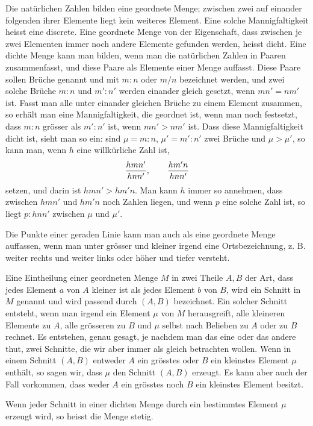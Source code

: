 \documentclass[11pt]{article}
\begin{document}
Die natürlichen Zahlen bilden eine geordnete Menge; zwischen zwei auf einander folgenden ihrer Elemente liegt kein weiteres Element. Eine solche Mannigfaltigkeit heisst eine discrete. Eine geordnete Menge von der Eigenschaft, dass zwischen je zwei Elementen immer noch andere Elemente gefunden werden, heisst dicht. Eine dichte Menge kann man bilden, wenn man die natürlichen Zahlen in Paaren zusammenfasst, und diese Paare als Elemente einer Menge auffasst. Diese Paare sollen Brüche genannt und mit $m:n$ oder $m/n$ bezeichnet werden, und zwei solche Brüche $m:n$ und $m':n'$ werden einander gleich gesetzt, wenn $mn'=nm'$ ist. Fasst man alle unter einander gleichen Brüche zu einem Element zusammen, so erhält man eine Mannigfaltigkeit, die geordnet ist, wenn man noch festsetzt, dass $m:n$ grösser als $m':n'$ ist, wenn $mn'>nm'$ ist. Dass diese Mannigfaltigkeit dicht ist, sieht man so ein: sind $\mu=m:n$, $\mu'=m':n'$ zwei Brüche und $\mu>\mu'$, so kann man, wenn $h$ eine willkürliche Zahl ist,
\[
 {hmn'\over hnn'},
 \qquad
 {hm'n\over hnn'}
\]
setzen, und darin ist $hmn'>hm'n$. Man kann $h$ immer so annehmen, dass zwischen $hmn'$ und $hm'n$ noch Zahlen liegen, und wenn $p$ eine solche Zahl ist, so liegt $p:hnn'$ zwischen $\mu$ und $\mu'$.

Die Punkte einer geraden Linie kann man auch als eine geordnete Menge auffassen, wenn man unter grösser und kleiner irgend eine Ortsbezeichnung, z. B. weiter rechts und weiter links oder höher und tiefer versteht.

Eine Eintheilung einer geordneten Menge $M$ in zwei Theile $A,B$ der Art, dass jedes Element $a$ von $A$ kleiner ist als jedes Element $b$ von $B$, wird ein Schnitt in $M$ genannt und wird passend durch $(A,B)$ bezeichnet. Ein solcher Schnitt entsteht, wenn man irgend ein Element $\mu$ von $M$ herausgreift, alle kleineren Elemente zu $A$, alle grösseren zu $B$ und $\mu$ selbst nach Belieben zu $A$ oder zu $B$ rechnet. Es entstehen, genau gesagt, je nachdem man das eine oder das andere thut, zwei Schnitte, die wir aber immer als gleich betrachten wollen. Wenn in einem Schnitt $(A,B)$ entweder $A$ ein grösstes oder $B$ ein kleinstes Element $\mu$ enthält, so sagen wir, dass $\mu$ den Schnitt $(A,B)$ erzeugt. Es kann aber auch der Fall vorkommen, dass weder $A$ ein grösstes noch $B$ ein kleinstes Element besitzt.

Wenn jeder Schnitt in einer dichten Menge durch ein bestimmtes Element $\mu$ erzeugt wird, so heisst die Menge stetig.
\end{document}
